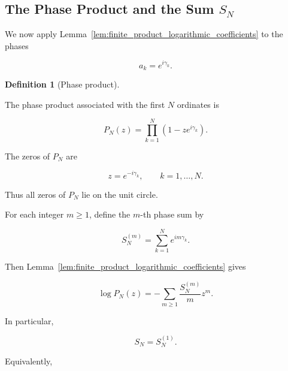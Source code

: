 \documentclass[11pt]{amsart}
\numberwithin{equation}{section}
\theoremstyle{plain}
\theoremstyle{definition}
\newtheorem{definition}[theorem]{Definition}
\theoremstyle{remark}
\begin{document}
\subsection[The Phase Product and the Sum SN]{The Phase Product and the Sum \texorpdfstring{\(S_N\)}{SN}}
\label{subsec:phase_product_SN}

We now apply Lemma~\ref{lem:finite_product_logarithmic_coefficients}
to the phases

\begin{equation}
a_k
=
e^{i\gamma_k}.
\label{eq:phase_product_ak}
\end{equation}

\begin{definition}[Phase product]
\label{def:phase_product}

The phase product associated with the first \(N\) ordinates is

\begin{equation}
P_N(z)
=
\prod_{k=1}^{N}
\left(1-z e^{i\gamma_k}\right).
\label{eq:phase_product_definition}
\end{equation}

\end{definition}

The zeros of \(P_N\) are

\begin{equation}
z
=
e^{-i\gamma_k},
\qquad
k=1,\ldots,N.
\label{eq:phase_product_zeros}
\end{equation}

Thus all zeros of \(P_N\) lie on the unit circle.

For each integer \(m\ge 1\), define the \(m\)-th phase sum by

\begin{equation}
S_N^{(m)}
=
\sum_{k=1}^{N}
e^{im\gamma_k}.
\label{eq:higher_phase_sum_definition}
\end{equation}

Then Lemma~\ref{lem:finite_product_logarithmic_coefficients} gives

\begin{equation}
\log P_N(z)
=
-
\sum_{m\ge 1}
\frac{S_N^{(m)}}{m}
z^m.
\label{eq:phase_product_logarithmic_expansion}
\end{equation}

In particular,

\begin{equation}
S_N
=
S_N^{(1)}.
\label{eq:SN_first_phase_mode}
\end{equation}

Equivalently,
\end{document}
